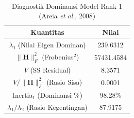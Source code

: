 \begin{table}[H]
\centering
\small
\caption{Diagnostik Dominansi Model Rank-1 (Areia \textit{et al.}, 2008)} \label{tab:app2struktur_diagnostik}
\begin{tabular}{|c|c|}
\hline
\textbf{Kuantitas} & \textbf{Nilai} \\
\hline
$\lambda_1$ (Nilai Eigen Dominan) & 239.6312 \\
$\|\mathbf{H}\|_F^2$ (Frobenius$^2$) & 57431.4584 \\
$V$ (SS Residual) & 8.3571 \\
$V / \|\mathbf{H}\|_F^2$ (Rasio Sisa) & 0.0001 \\
Inertia$_1$ (Dominansi \%) & 98.28\% \\
$\lambda_1 / \lambda_2$ (Rasio Kegentingan) & 87.9175 \\
\hline
\end{tabular}
\end{table}